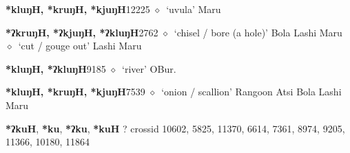 \begin{list}{}{\leftmargin=1.5em \itemindent=-1.5em}
  \item {\footnotesize \textbf{*kluŋH, *kruŋH, *kjuŋH}}{\tiny 12225}
\hspace{1ex}
         $\diamond$~`uvula'
         Maru 
  \item {\footnotesize \textbf{*ʔkruŋH, *ʔkjuŋH, *ʔkluŋH}}{\tiny 2762}
\hspace{1ex}
         $\diamond$~`chisel / bore (a hole)'
         Bola 
\hspace{1ex}
         Lashi 
\hspace{1ex}
         Maru 
\hspace{1ex}
         $\diamond$~`cut / gouge out'
         Lashi 
\hspace{1ex}
         Maru 
  \item {\footnotesize \textbf{*kluŋH, *ʔkluŋH}}{\tiny 9185}
\hspace{1ex}
         $\diamond$~`river'
         OBur. 
  \item {\footnotesize \textbf{*kluŋH, *kruŋH, *kjuŋH}}{\tiny 7539}
\hspace{1ex}
         $\diamond$~`onion / scallion'
         Rangoon 
\hspace{1ex}
         Atsi 
\hspace{1ex}
         Bola 
\hspace{1ex}
         Lashi 
\hspace{1ex}
         Maru 
  \end{list}
\item
\textbf{*ʔkuH}, \textbf{*ku}, \textbf{*ʔku}, \textbf{*kuH}
?
  {\tiny crossid 10602, 5825, 11370, 6614, 7361, 8974, 9205, 11366, 10180, 11864}
